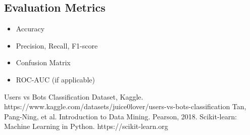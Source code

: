 \documentclass[conference]{IEEEtran}
\begin{document}
\subsection{Evaluation Metrics}
\begin{itemize}
    \item Accuracy
    \item Precision, Recall, F1-score
    \item Confusion Matrix
    \item ROC-AUC (if applicable)
\end{itemize}

\begin{thebibliography}{00}
 Users vs Bots Classification Dataset, Kaggle. https://www.kaggle.com/datasets/juice0lover/users-vs-bots-classification
 Tan, Pang-Ning, et al. Introduction to Data Mining. Pearson, 2018.
 Scikit-learn: Machine Learning in Python. https://scikit-learn.org
\end{thebibliography}
\end{document}
